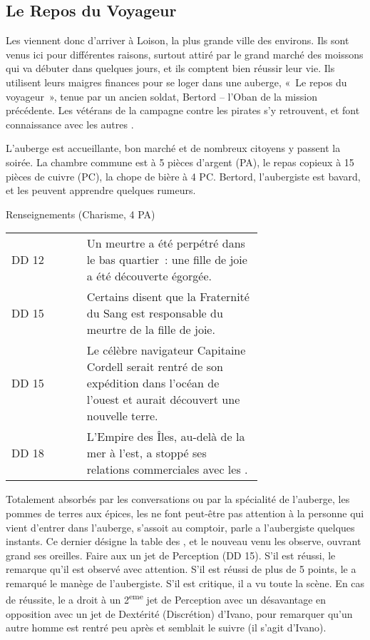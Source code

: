 \documentclass[a4paper,10pt,openany]{book}
\begin{document}
\begin{multicols}{2}
\subsection{Le Repos du Voyageur}
Les \PJs viennent donc d’arriver à Loison, la plus grande ville des environs. Ils sont venus ici pour différentes raisons, surtout attiré par le grand
marché des moissons qui va débuter dans quelques jours, et ils comptent bien réussir leur vie. Ils utilisent leurs maigres finances pour se loger dans
une auberge, « Le repos du voyageur », tenue par un ancien soldat, Bertord – l’Oban de la mission précédente. Les \PJs vétérans de la campagne contre
les pirates s’y retrouvent, et font connaissance avec les autres \PJs.\par L’auberge est accueillante, bon marché et de nombreux citoyens y passent la
soirée. La chambre commune est à 5 pièces d’argent (PA), le repas copieux à 15 pièces de cuivre (PC), la chope de bière à 4 PC. Bertord, l’aubergiste
est bavard, et les \PJs peuvent apprendre quelques rumeurs.

\begin{quotebox}
	Renseignements (Charisme, 4 PA)\par\noindent
	\begin{tabular}{lp{0.7\linewidth}}
		DD 12 & Un meurtre a été perpétré dans le bas quartier : une fille de joie a été découverte égorgée.\\
		DD 15 & Certains disent que la Fraternité du Sang est responsable du meurtre de la fille de joie.\\
		DD 15 & Le célèbre navigateur Capitaine Cordell serait rentré de son expédition dans l’océan de l’ouest et aurait découvert une nouvelle terre.\\
		DD 18 & L’Empire des Îles, au-delà de la mer à l’est, a stoppé ses relations commerciales avec les \Royaumes.
	\end{tabular}
\end{quotebox}

Totalement absorbés par les conversations ou par la spécialité de l’auberge, les pommes de terres aux épices, les \PJs ne font peut-être pas
attention à la personne qui vient d’entrer dans l’auberge, s’assoit au comptoir, parle a l’aubergiste quelques instants. Ce dernier désigne la table
des \PJs, et le nouveau venu les observe, ouvrant grand ses oreilles. Faire aux \PJs un jet de Perception (DD 15). S’il est réussi, le \PJ remarque
qu’il est observé avec attention. S’il est réussi de plus de 5 points, le \PJ a remarqué le manège de l’aubergiste. S’il  est critique, il a vu toute
la scène. En cas de réussite, le \PJ a droit à un 2\textsuperscript{eme} jet de Perception avec un désavantage en opposition avec un jet de Dextérité
(Discrétion) d’Ivano, pour remarquer qu’un autre homme est rentré peu après et semblait le suivre (il s’agit d’Ivano).


\end{multicols}
\end{document}
